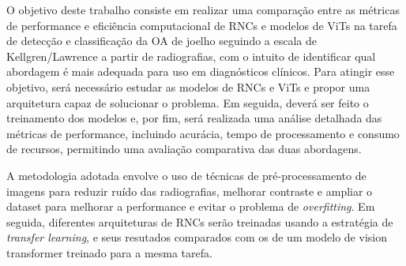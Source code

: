 O objetivo deste trabalho consiste em realizar uma comparação entre as métricas de performance e eficiência computacional de RNCs e modelos de ViTs na tarefa de detecção e classificação da OA de joelho seguindo a escala de Kellgren/Lawrence a partir de radiografias, com o intuito de identificar qual abordagem é mais adequada para uso em diagnósticos clínicos. Para atingir esse objetivo, será necessário estudar as modelos de RNCs e ViTs e propor uma arquitetura capaz de solucionar o problema. Em seguida, deverá ser feito o treinamento dos modelos e, por fim, será realizada uma análise detalhada das métricas de performance, incluindo acurácia, tempo de processamento e consumo de recursos, permitindo uma avaliação comparativa das duas abordagens.

A metodologia adotada envolve o uso de técnicas de pré-processamento de imagens para reduzir ruído das radiografias, melhorar contraste e ampliar o dataset para melhorar a performance e evitar o problema de \textit{overfitting}. Em seguida, diferentes arquiteturas de RNCs serão treinadas usando a estratégia de \textit{transfer learning}, e seus resutados comparados com os de um modelo de vision transformer treinado para a mesma tarefa.